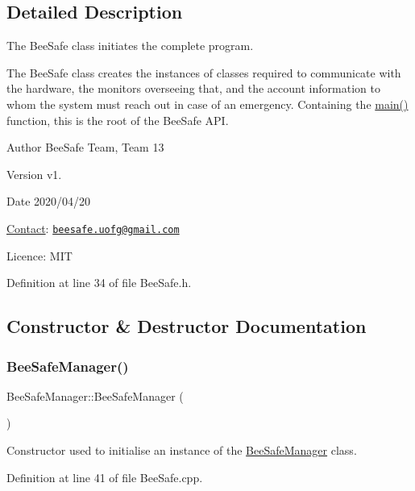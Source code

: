 \subsection{Detailed Description}
The Bee\+Safe class initiates the complete program. 

The Bee\+Safe class creates the instances of classes required to communicate with the hardware, the monitors overseeing that, and the account information to whom the system must reach out in case of an emergency. Containing the \hyperlink{_bee_safe_8cpp_ae66f6b31b5ad750f1fe042a706a4e3d4}{main()} function, this is the root of the Bee\+Safe A\+PI.

\begin{DoxyAuthor}{Author}
Bee\+Safe Team, Team 13
\end{DoxyAuthor}
\begin{DoxyVersion}{Version}
v1.
\end{DoxyVersion}
\begin{DoxyDate}{Date}
2020/04/20
\end{DoxyDate}
\hyperlink{class_contact}{Contact}\+: \href{mailto:beesafe.uofg@gmail.com}{\tt beesafe.\+uofg@gmail.\+com}

Licence\+: M\+IT 

Definition at line 34 of file Bee\+Safe.\+h.



\subsection{Constructor \& Destructor Documentation}
\mbox{\label{class_bee_safe_manager_a4a897d6317bdc548fb235d0cdb2877b1}} 
\subsubsection{\texorpdfstring{Bee\+Safe\+Manager()}{BeeSafeManager()}}
{\footnotesize\ttfamily Bee\+Safe\+Manager\+::\+Bee\+Safe\+Manager (\begin{DoxyParamCaption}{ }\end{DoxyParamCaption})}

Constructor used to initialise an instance of the \hyperlink{class_bee_safe_manager}{Bee\+Safe\+Manager} class. 

Definition at line 41 of file Bee\+Safe.\+cpp.


